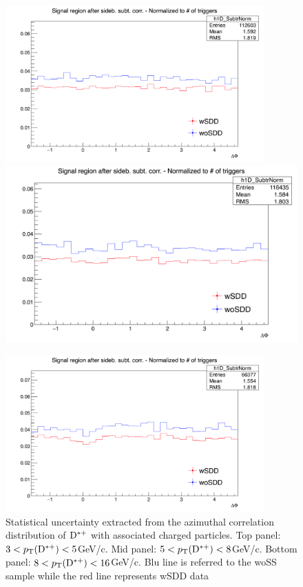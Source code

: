 \begin{figure}[!h]
\centering
\includegraphics[width=0.8\linewidth, height=6cm]{figures/wSDD_vs_woSDD/Uncertanty_AzimCorrDistr_Dstar_Canvas_PtIntBins2to3_PoolInt_thr0dot3to99dot0.png}
\includegraphics[width=0.8\linewidth]{figures/wSDD_vs_woSDD/Uncertanty_AzimCorrDistr_Dstar_Canvas_PtIntBins4to6_PoolInt_thr0dot3to99dot0.png}

\includegraphics[width=0.8\linewidth, height=6cm]{figures/wSDD_vs_woSDD/Uncertanty_AzimCorrDistr_Dstar_Canvas_PtIntBins7to9_PoolInt_thr0dot3to99dot0.png}
\caption{Statistical uncertainty extracted from the azimuthal correlation distribution of ${\rm D^{*+}}$ with associated charged particles. Top panel: $3 < p_{\rm T}({\rm D^{*+}}) < 5 $GeV/c.
Mid panel: $5 < p_{\rm T}({\rm D^{*+}}) < 8 $GeV/c. Bottom panel: $8 < p_{\rm T}({\rm D^{*+}}) < 16 $GeV/c.
Blu line is referred to the woSS sample while the red line represents wSDD data}
\label{wSSvswoSDDuncertainty}
\end{figure}

